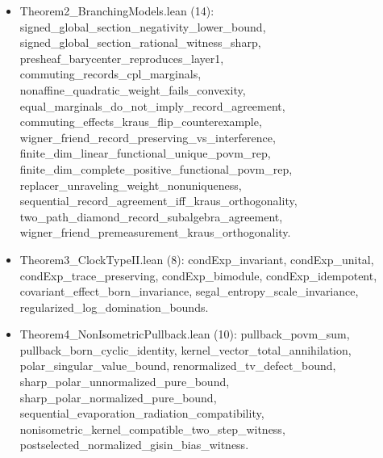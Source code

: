 \documentclass[11pt,a4paper]{article}
\theoremstyle{definition}
\theoremstyle{remark}
\newcommand{\1}{\mathbf{1}}
\newcommand{\code}[1]{{\scriptsize\ttfamily #1}}
\begin{document}
{\begin{itemize}
  \item \code{Theorem2\_\allowbreak BranchingModels.lean} (14): \code{signed\_\allowbreak global\_\allowbreak section\_\allowbreak negativity\_\allowbreak lower\_\allowbreak bound}, \code{signed\_\allowbreak global\_\allowbreak section\_\allowbreak rational\_\allowbreak witness\_\allowbreak sharp}, \code{presheaf\_\allowbreak barycenter\_\allowbreak reproduces\_\allowbreak layer1}, \code{commuting\_\allowbreak records\_\allowbreak cpl\_\allowbreak marginals}, \code{nonaffine\_\allowbreak quadratic\_\allowbreak weight\_\allowbreak fails\_\allowbreak convexity}, \code{equal\_\allowbreak marginals\_\allowbreak do\_\allowbreak not\_\allowbreak imply\_\allowbreak record\_\allowbreak agreement}, \code{commuting\_\allowbreak effects\_\allowbreak kraus\_\allowbreak flip\_\allowbreak counterexample}, \code{wigner\_\allowbreak friend\_\allowbreak record\_\allowbreak preserving\_\allowbreak vs\_\allowbreak interference}, \code{finite\_\allowbreak dim\_\allowbreak linear\_\allowbreak functional\_\allowbreak unique\_\allowbreak povm\_\allowbreak rep}, \code{finite\_\allowbreak dim\_\allowbreak complete\_\allowbreak positive\_\allowbreak functional\_\allowbreak povm\_\allowbreak rep}, \code{replacer\_\allowbreak unraveling\_\allowbreak weight\_\allowbreak nonuniqueness}, \code{sequential\_\allowbreak record\_\allowbreak agreement\_\allowbreak iff\_\allowbreak kraus\_\allowbreak orthogonality}, \code{two\_\allowbreak path\_\allowbreak diamond\_\allowbreak record\_\allowbreak subalgebra\_\allowbreak agreement}, \code{wigner\_\allowbreak friend\_\allowbreak premeasurement\_\allowbreak kraus\_\allowbreak orthogonality}.
  \item \code{Theorem3\_\allowbreak ClockTypeII.lean} (8): \code{condExp\_\allowbreak invariant}, \code{condExp\_\allowbreak unital}, \code{condExp\_\allowbreak trace\_\allowbreak preserving}, \code{condExp\_\allowbreak bimodule}, \code{condExp\_\allowbreak idempotent}, \code{covariant\_\allowbreak effect\_\allowbreak born\_\allowbreak invariance}, \code{segal\_\allowbreak entropy\_\allowbreak scale\_\allowbreak invariance}, \code{regularized\_\allowbreak log\_\allowbreak domination\_\allowbreak bounds}.
  \item \code{Theorem4\_\allowbreak NonIsometricPullback.lean} (10): \code{pullback\_\allowbreak povm\_\allowbreak sum}, \code{pullback\_\allowbreak born\_\allowbreak cyclic\_\allowbreak identity}, \code{kernel\_\allowbreak vector\_\allowbreak total\_\allowbreak annihilation}, \code{polar\_\allowbreak singular\_\allowbreak value\_\allowbreak bound}, \code{renormalized\_\allowbreak tv\_\allowbreak defect\_\allowbreak bound}, \code{sharp\_\allowbreak polar\_\allowbreak unnormalized\_\allowbreak pure\_\allowbreak bound}, \code{sharp\_\allowbreak polar\_\allowbreak normalized\_\allowbreak pure\_\allowbreak bound}, \code{sequential\_\allowbreak evaporation\_\allowbreak radiation\_\allowbreak compatibility}, \code{nonisometric\_\allowbreak kernel\_\allowbreak compatible\_\allowbreak two\_\allowbreak step\_\allowbreak witness}, \code{postselected\_\allowbreak normalized\_\allowbreak gisin\_\allowbreak bias\_\allowbreak witness}.

\end{itemize}}
\end{document}
